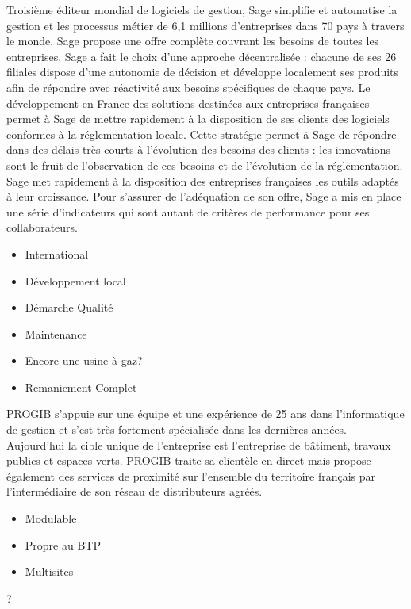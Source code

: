 {
  Troisième éditeur mondial de logiciels de gestion, Sage simplifie et automatise la gestion et les processus métier de 6,1 millions d'entreprises dans 70 pays à travers le monde.
  Sage propose une offre complète couvrant les besoins de toutes les entreprises.
  Sage a fait le choix d'une approche décentralisée : chacune de ses 26 filiales dispose d'une autonomie
   de décision et développe localement ses produits afin de répondre avec réactivité aux besoins spécifiques de chaque pays.
   Le développement en France des solutions destinées aux entreprises françaises permet  à  Sage de mettre rapidement à la disposition de ses clients des logiciels conformes à la réglementation locale.
  Cette stratégie permet à Sage de répondre dans des délais très courts  à  l'évolution des besoins des clients : les innovations sont le fruit de l'observation de ces besoins et de l'évolution de la réglementation.
  Sage met rapidement à la disposition des entreprises françaises les outils adaptés à leur croissance.
  Pour s'assurer de l'adéquation de son offre, Sage a mis en place une série d'indicateurs qui sont autant de critères de performance pour ses collaborateurs.
}
{
    \begin{itemize}
        \item International
        \item Développement local
        \item Démarche Qualité
        \item Maintenance
    \end{itemize}
}
{
    \begin{itemize}
        \item Encore une usine à gaz?
        \item Remaniement Complet
    \end{itemize}
}
 
{
PROGIB s'appuie sur une équipe et une expérience de 25 ans dans l'informatique de gestion et s'est très fortement spécialisée dans les dernières années.
Aujourd'hui la cible unique de l'entreprise est l'entreprise de bâtiment, travaux publics et espaces verts.
PROGIB traite sa clientèle en direct mais propose également des services de proximité sur l'ensemble du territoire
français par l'intermédiaire de son réseau de distributeurs agréés.
}
{
    \begin{itemize}
        \item Modulable
        \item Propre au BTP
        \item Multisites
    \end{itemize}
}
{
    ?
}
